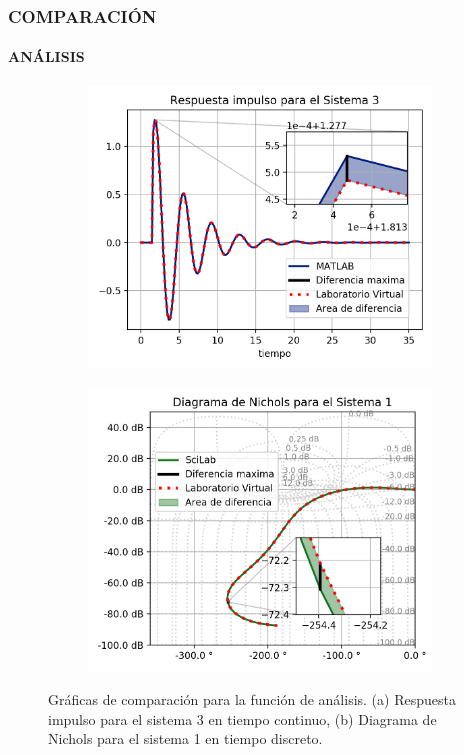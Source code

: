 \documentclass[usenames,xcolor={dvipsnames, table}]{beamer}
\begin{document}
\begin{frame}
	\frametitle{COMPARACIÓN}
	\framesubtitle{ANÁLISIS}
	\vspace{25pt}
	\begin{figure}
		\begin{subfigure}[t]{0.49\linewidth}
			\includegraphics[width=\linewidth]{imagenes/Set3Imp.png}
			\caption{}
		\end{subfigure}
		\hfill
		\begin{subfigure}[t]{0.49\linewidth}
			\includegraphics[width=\linewidth]{imagenes/ScSet1DNichols.png}
			\caption{}
		\end{subfigure}
		\caption{Gráficas de comparación para la función de análisis. (a) Respuesta impulso para el sistema 3 en tiempo continuo, (b) Diagrama de Nichols para el sistema 1 en tiempo discreto.}
	\end{figure}

\end{frame}
\end{document}
